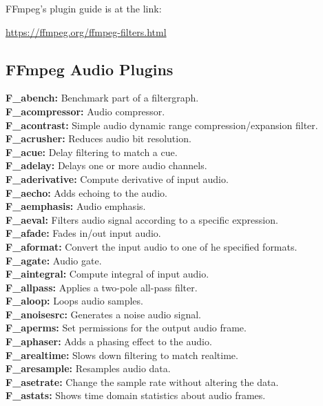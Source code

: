 FFmpeg’s plugin guide is at the link:

{\small \url{https://ffmpeg.org/ffmpeg-filters.html}}

\subsection{FFmpeg Audio Plugins}%
\label{sub:ffmpeg_audio_plugins}

\noindent \textbf{F\_abench:} Benchmark part of a filtergraph.\\
\textbf{F\_acompressor:} Audio compressor.\\
\textbf{F\_acontrast:} Simple audio dynamic range compression/expansion filter.\\
\textbf{F\_acrusher:} Reduces audio bit resolution.\\
\textbf{F\_acue:} Delay filtering to match a cue.\\
\textbf{F\_adelay:} Delays one or more audio channels. \\
\textbf{F\_aderivative:} Compute derivative of input audio.\\
\textbf{F\_aecho:} Adds echoing to the audio.\\
\textbf{F\_aemphasis:} Audio emphasis.\\
\textbf{F\_aeval:} Filters audio signal according to a specific expression.\\
\textbf{F\_afade:} Fades in/out input audio. \\
\textbf{F\_aformat:} Convert the input audio to one of he specified formats.\\
\textbf{F\_agate:} Audio gate.\\
\textbf{F\_aintegral:} Compute integral of input audio.\\
\textbf{F\_allpass:} Applies a two-pole all-pass filter.\\
\textbf{F\_aloop:} Loops audio samples.\\
\textbf{F\_anoisesrc:} Generates a noise audio signal.\\
\textbf{F\_aperms:} Set permissions for the output audio frame.\\
\textbf{F\_aphaser:} Adds a phasing effect to the audio.\\
\textbf{F\_arealtime:} Slows down filtering to match realtime.\\
\textbf{F\_aresample:} Resamples audio data.\\
\textbf{F\_asetrate:} Change the sample rate without altering the data.\\
\textbf{F\_astats:} Shows time domain statistics about audio frames.\\
